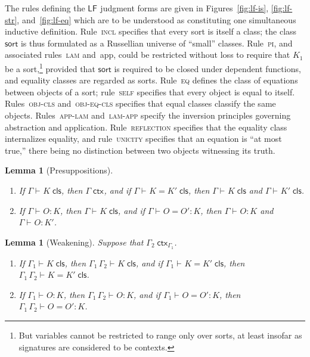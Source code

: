 \documentclass[11pt,twoside]{article}
\newtheorem{lemma}[theorem]{Lemma}
\newcommand{\LF}[1][]{\ensuremath{\mathsf{LF}_{#1}}}
\newcommand{\sortclass}{\ensuremath{\textsf{sort}}}
\newcommand{\appctx}[2]{{#1}\,{#2}}
\newcommand{\isctx}[2][]{{#2}\;\mathsf{ctx}_{#1}}
\newcommand{\iscls}[3][]{{#2}\vdash_{#1}{#3}\;\mathsf{cls}}
\newcommand{\eqcls}[4][]{{#2}\vdash_{#1}{#3}={#4}\;\mathsf{cls}}
\newcommand{\isobj}[4][]{{#2}\vdash_{#1}{#3}:{#4}}
\newcommand{\eqobj}[5][]{{#2}\vdash_{#1}{#3}={#4}:{#5}}
\begin{document}
The rules defining the \LF{} judgment forms are given in Figures~\ref{fig:lf-is},
\ref{fig:lf-str}, and~\ref{fig:lf-eq} which are to be understood as constituting one
simultaneous inductive definition.  Rule~\textsc{incl} specifies that every sort is itself
a class; the class $\sortclass$ is thus formulated as a Russellian universe of ``small''
classes.  Rule~\textsc{pi}, and associated rules~\textsc{lam} and~\textsf{app}, could be
restricted without loss to require that $K_{1}$ be a sort,\footnote{But variables cannot
  be restricted to range only over sorts, at least insofar as signatures are considered to
  be contexts.} provided that \sortclass{} is required to be closed under dependent
functions, and equality classes are regarded as sorts.  Rule~\textsc{eq} defines the class
of equations between objects of a sort; rule~\textsc{self} specifies that every object is
equal to itself.  Rules~\textsc{obj-cls} and~\textsc{obj-eq-cls} specifies that equal
classes classify the same objects.  Rules~\textsc{app-lam} and~\textsc{lam-app} specify
the inversion principles governing abstraction and application.  Rule~\textsc{reflection}
specifies that the equality class internalizes equality, and rule~\textsc{unicity}
specifies that an equation is ``at most true,'' there being no distinction between two
objects witnessing its truth.

\begin{lemma}[Presuppositions]
  \label{lemma:presup}
  \begin{enumerate}
  \item If\/ $\iscls{\Gamma}{K}$, then $\isctx{\Gamma}$, and if\/ $\eqcls{\Gamma}{K}{K'}$, then $\iscls{\Gamma}{K}$
    and $\iscls{\Gamma}{K'}$.
  \item If\/ $\isobj{\Gamma}{O}{K}$, then $\iscls{\Gamma}{K}$, and if\/ $\eqobj{\Gamma}{O}{O'}{K}$, then
    $\isobj{\Gamma}{O}{K}$ and $\isobj{\Gamma}{O}{K'}$.
  \end{enumerate}
\end{lemma}

\begin{lemma}[Weakening]
  \label{lemma:weak}
  Suppose that $\isctx[\Gamma_1]{\Gamma_2}$.
  \begin{enumerate}
  \item If\/ $\iscls{\Gamma_1}{K}$, then $\iscls{\appctx{\Gamma_{1}}{\Gamma_2}}{K}$, and if\/
    $\eqcls{\Gamma_1}{K}{K'}$, then $\eqcls{\appctx{\Gamma_1}{\Gamma_2}}{K}{K'}$.
  \item If\/ $\isobj{\Gamma_1}{O}{K}$, then $\isobj{\appctx{\Gamma_1}{\Gamma_2}}{O}{K}$, and if\/
    $\eqobj{\Gamma_1}{O}{O'}{K}$, then $\eqobj{\appctx{\Gamma_1}{\Gamma_2}}{O}{O'}{K}$.
  \end{enumerate}
\end{lemma}
\end{document}
